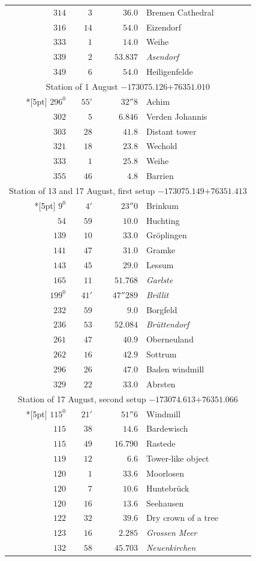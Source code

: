 \begin{longtable}{@{}rrrp{.61\linewidth}@{}}
\(314\)&\(3\)&\(36.0\)&\raggedright Bremen Cathedral\tabularnewline
\(316\)&\(14\)&\(54.0\)&\raggedright Eizendorf\tabularnewline
\(333\)&\(1\)&\(14.0\)&\raggedright Weihe\tabularnewline
\(339\)&\(2\)&\(53.837\)&\raggedright \textit{Asendorf}\tabularnewline
\(349\)&\(6\)&\(54.0\)&\raggedright Heiligenfelde\tabularnewline
\multicolumn{4}{c}{Station of 1 August \(-173075.126\)\qquad\(+76351.010\)}\\*[5pt]
\(296^{0}\)&\(55'\)&\(32''8\)&\raggedright Achim\tabularnewline
\(302\)&\(5\)&\(6.846\)&\raggedright Verden Johannis\tabularnewline
\(303\)&\(28\)&\(41.8\)&\raggedright Distant tower\tabularnewline
\(321\)&\(18\)&\(23.8\)&\raggedright Wechold\tabularnewline
\(333\)&\(1\)&\(25.8\)&\raggedright Weihe\tabularnewline
\(355\)&\(46\)&\(4.8\)&\raggedright Barrien\tabularnewline
\multicolumn{4}{c}{Station of 13 and 17 August, first setup \(-173075.149\)\qquad\(+76351.413\)}\\*[5pt]
\(9^{0}\)&\(4'\)&\(23''0\)&\raggedright Brinkum\tabularnewline
\(54\)&\(59\)&\(10.0\)&\raggedright Huchting\tabularnewline
\(139\)&\(10\)&\(33.0\)&\raggedright Gröplingen\tabularnewline
\(141\)&\(47\)&\(31.0\)&\raggedright Gramke\tabularnewline
\(143\)&\(45\)&\(29.0\)&\raggedright Lessum\tabularnewline
\(165\)&\(11\)&\(51.768\)&\raggedright \textit{Garlste}\tabularnewline
\(199^{0}\)&\(41'\)&\(47''289\)&\raggedright \textit{Brillit}\tabularnewline
\(232\)&\(59\)&\(9.0\)&\raggedright Borgfeld\tabularnewline
\(236\)&\(53\)&\(52.084\)&\raggedright \textit{Brüttendorf}\tabularnewline
\(261\)&\(47\)&\(40.9\)&\raggedright Oberneuland\tabularnewline
\(262\)&\(16\)&\(42.9\)&\raggedright Sottrum\tabularnewline
\(296\)&\(26\)&\(47.0\)&\raggedright Baden windmill\tabularnewline
\(329\)&\(22\)&\(33.0\)&\raggedright Abrsten\tabularnewline
\multicolumn{4}{c}{Station of 17 August, second setup \(-173074.613\)\qquad\(+76351.066\)}\\*[5pt]
\(115^{0}\)&\(21'\)&\(51''6\)&\raggedright Windmill\tabularnewline
\(115\)&\(38\)&\(14.6\)&\raggedright Bardewisch\tabularnewline
\(115\)&\(49\)&\(16.790\)&\raggedright Rastede\tabularnewline
\(119\)&\(12\)&\(6.6\)&\raggedright Tower-like object\tabularnewline
\(120\)&\(1\)&\(33.6\)&\raggedright Moorlosen\tabularnewline
\(120\)&\(7\)&\(10.6\)&\raggedright Huntebrück\tabularnewline
\(120\)&\(16\)&\(13.6\)&\raggedright Seehausen\tabularnewline
\(122\)&\(32\)&\(39.6\)&\raggedright Dry crown of a tree\tabularnewline
\(123\)&\(16\)&\(2.285\)&\raggedright \textit{Grossen Meer}\tabularnewline
\(132\)&\(58\)&\(45.703\)&\raggedright \textit{Neuenkirchen}\tabularnewline

\end{longtable}

